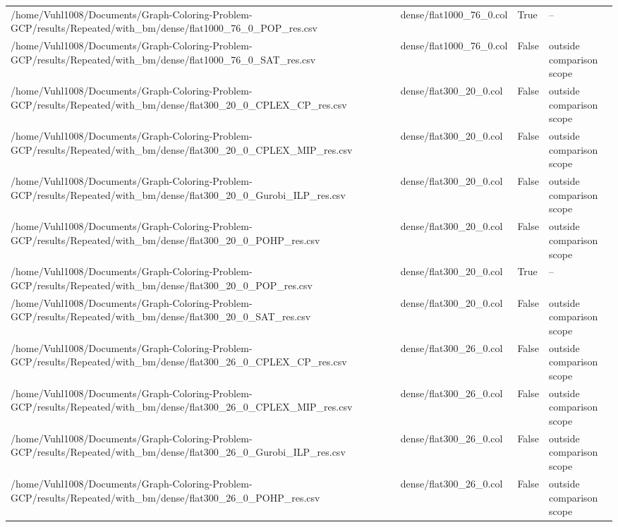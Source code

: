 \begin{table}[htbp]
\begin{tabular}{llll}
/home/Vuhl1008/Documents/Graph-Coloring-Problem-GCP/results/Repeated/with\_bm/dense/flat1000\_76\_0\_POP\_res.csv & dense/flat1000\_76\_0.col & True & -- \\
/home/Vuhl1008/Documents/Graph-Coloring-Problem-GCP/results/Repeated/with\_bm/dense/flat1000\_76\_0\_SAT\_res.csv & dense/flat1000\_76\_0.col & False & outside comparison scope \\
/home/Vuhl1008/Documents/Graph-Coloring-Problem-GCP/results/Repeated/with\_bm/dense/flat300\_20\_0\_CPLEX\_CP\_res.csv & dense/flat300\_20\_0.col & False & outside comparison scope \\
/home/Vuhl1008/Documents/Graph-Coloring-Problem-GCP/results/Repeated/with\_bm/dense/flat300\_20\_0\_CPLEX\_MIP\_res.csv & dense/flat300\_20\_0.col & False & outside comparison scope \\
/home/Vuhl1008/Documents/Graph-Coloring-Problem-GCP/results/Repeated/with\_bm/dense/flat300\_20\_0\_Gurobi\_ILP\_res.csv & dense/flat300\_20\_0.col & False & outside comparison scope \\
/home/Vuhl1008/Documents/Graph-Coloring-Problem-GCP/results/Repeated/with\_bm/dense/flat300\_20\_0\_POHP\_res.csv & dense/flat300\_20\_0.col & False & outside comparison scope \\
/home/Vuhl1008/Documents/Graph-Coloring-Problem-GCP/results/Repeated/with\_bm/dense/flat300\_20\_0\_POP\_res.csv & dense/flat300\_20\_0.col & True & -- \\
/home/Vuhl1008/Documents/Graph-Coloring-Problem-GCP/results/Repeated/with\_bm/dense/flat300\_20\_0\_SAT\_res.csv & dense/flat300\_20\_0.col & False & outside comparison scope \\
/home/Vuhl1008/Documents/Graph-Coloring-Problem-GCP/results/Repeated/with\_bm/dense/flat300\_26\_0\_CPLEX\_CP\_res.csv & dense/flat300\_26\_0.col & False & outside comparison scope \\
/home/Vuhl1008/Documents/Graph-Coloring-Problem-GCP/results/Repeated/with\_bm/dense/flat300\_26\_0\_CPLEX\_MIP\_res.csv & dense/flat300\_26\_0.col & False & outside comparison scope \\
/home/Vuhl1008/Documents/Graph-Coloring-Problem-GCP/results/Repeated/with\_bm/dense/flat300\_26\_0\_Gurobi\_ILP\_res.csv & dense/flat300\_26\_0.col & False & outside comparison scope \\
/home/Vuhl1008/Documents/Graph-Coloring-Problem-GCP/results/Repeated/with\_bm/dense/flat300\_26\_0\_POHP\_res.csv & dense/flat300\_26\_0.col & False & outside comparison scope \\

\end{tabular}
\end{table}
